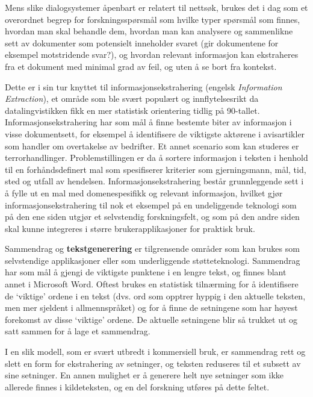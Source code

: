 \begin{multicols}{2}
Mens slike dialogsystemer åpenbart er relatert til nettsøk, brukes det i dag som et overordnet begrep for forskningsspørsmål som hvilke typer spørsmål som finnes, hvordan man skal behandle dem, hvordan man kan analysere og sammenlikne sett av dokumenter som potensielt inneholder svaret (gir dokumentene for eksempel motstridende svar?), og hvordan relevant informasjon kan ekstraheres fra et dokument med minimal grad av feil, og uten å se bort fra kontekst.

Dette er i sin tur knyttet til informasjonsekstrahering (engelsk \textit{Information Extraction}), et område som ble svært populært og innflytelsesrikt da datalingvistikken fikk en mer statistisk orientering tidlig på 90-tallet. Informasjonsekstrahering har som mål å finne bestemte biter av informasjon i visse dokumentsett,  for eksempel å identifisere de viktigste aktørene i avisartikler som handler om overtakelse av bedrifter. Et annet scenario som kan studeres er terrorhandlinger. Problemstillingen er da å sortere informasjon i teksten i henhold til en forhåndsdefinert mal som spesifiserer kriterier som gjerningsmann, mål, tid, sted og utfall av hendelsen. Informasjonsekstrahering består grunnleggende sett i å fylle ut en mal med domenespesifikk og relevant informasjon, hvilket gjør informasjonsekstrahering til nok et eksempel på en undeliggende teknologi som  på den ene siden utgjør et selvstendig forskningsfelt, og som på den andre siden skal kunne integreres i større brukerapplikasjoner for praktisk bruk.

Sammendrag og \textbf{tekstgenerering} er tilgrensende områder som kan brukes som selvstendige applikasjoner eller som underliggende støtteteknologi. Sammendrag har som mål å gjengi de viktigste punktene i en lengre tekst, og finnes blant annet i Microsoft Word. Oftest brukes en statistisk tilnærming for å identifisere de `viktige' ordene i en tekst (dvs. ord som opptrer hyppig i den aktuelle teksten, men mer sjeldent i allmennspråket) og for å finne de setningene som har høyest forekomst av disse `viktige' ordene. De aktuelle setningene blir så trukket ut og satt sammen for å lage et sammendrag. 

I en slik modell, som er svært utbredt i kommersiell bruk, er sammendrag rett og slett en form for ekstrahering av setninger, og teksten reduseres til et subsett av sine setninger. En annen mulighet er å generere helt nye setninger som ikke allerede finnes i kildeteksten, og en del forskning utføres på dette feltet.



\end{multicols}
